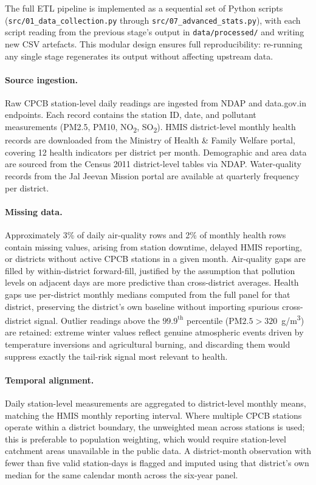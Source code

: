 \documentclass{article}
\begin{document}
The full ETL pipeline is implemented as a sequential set of Python scripts
(\texttt{src/01\_data\_collection.py} through \texttt{src/07\_advanced\_stats.py}), with
each script reading from the previous stage's output in \texttt{data/processed/} and
writing new CSV artefacts. This modular design ensures full reproducibility: re-running any
single stage regenerates its output without affecting upstream data.

\paragraph{Source ingestion.}
Raw CPCB station-level daily readings are ingested from NDAP and data.gov.in endpoints.
Each record contains the station ID, date, and pollutant measurements (PM2.5, PM10,
NO\textsubscript{2}, SO\textsubscript{2}). HMIS district-level monthly health records are
downloaded from the Ministry of Health \& Family Welfare portal, covering 12 health
indicators per district per month. Demographic and area data are sourced from the Census
2011 district-level tables via NDAP. Water-quality records from the Jal Jeevan Mission
portal are available at quarterly frequency per district.

\paragraph{Missing data.}
Approximately 3\% of daily air-quality rows and 2\% of monthly health rows contain missing
values, arising from station downtime, delayed HMIS reporting, or districts without active
CPCB stations in a given month. Air-quality gaps are filled by within-district
forward-fill, justified by the assumption that pollution levels on adjacent days are more
predictive than cross-district averages. Health gaps use per-district monthly medians
computed from the full panel for that district, preserving the district's own baseline
without importing spurious cross-district signal. Outlier readings above the
$99.9^{\text{th}}$ percentile ($\text{PM2.5} > 320$~\textmu{}g/m\textsuperscript{3}) are
retained: extreme winter values reflect genuine atmospheric events driven by temperature
inversions and agricultural burning, and discarding them would suppress exactly the
tail-risk signal most relevant to health.

\paragraph{Temporal alignment.}
Daily station-level measurements are aggregated to district-level monthly means, matching
the HMIS monthly reporting interval. Where multiple CPCB stations operate within a district
boundary, the unweighted mean across stations is used; this is preferable to population
weighting, which would require station-level catchment areas unavailable in the public
data. A district-month observation with fewer than five valid station-days is flagged and
imputed using that district's own median for the same calendar month across the six-year
panel.
\end{document}

